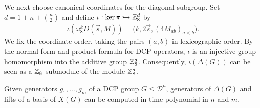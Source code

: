 We next choose canonical coordinates for the diagonal
subgroup. Set $d=1+n+\binom{n}{2}$ and define $\iota:\ker\pi\hookrightarrow\mathbb{Z}_8^d$ by
\begin{align}
    \iota \left( \omega_8^kD(\vec{s},M) \right) =
    \big(k,2\vec{s},(4M_{ab})_{a<b}\big).
\end{align}
We fix the coordinate order, taking the pairs $(a,b)$
in lexicographic order. By the normal form and product formula for DCP operators, $\iota$ is an injective group homomorphism into the additive group $\mathbb{Z}_8^d$.
Consequently, $\iota(\Delta(G))$ can be seen as a $\mathbb{Z}_8$-submodule of the module $\mathbb{Z}_8^d$.

\begin{lemma}\label{lem:diagonal-generators}
Given generators $g_1,\ldots,g_m$ of a DCP group $G\leq\mathcal D^n$, generators of $\Delta(G)$ and lifts of a basis of $X(G)$ can be computed in time polynomial in $n$ and $m$.
\end{lemma}
